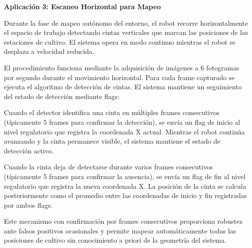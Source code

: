 \textbf{Aplicación 3: Escaneo Horizontal para Mapeo}

Durante la fase de mapeo autónomo del entorno, el robot recorre horizontalmente el espacio de trabajo detectando cintas verticales que marcan las posiciones de las estaciones de cultivo. El sistema opera en modo continuo mientras el robot se desplaza a velocidad reducida.

El procedimiento funciona mediante la adquisición de imágenes a 6 fotogramas por segundo durante el movimiento horizontal. Para cada frame capturado se ejecuta el algoritmo de detección de cintas. El sistema mantiene un seguimiento del estado de detección mediante flags:

Cuando el detector identifica una cinta en múltiples frames consecutivos (típicamente 5 frames para confirmar la detección), se envía un flag de inicio al nivel regulatorio que registra la coordenada X actual. Mientras el robot continúa avanzando y la cinta permanece visible, el sistema mantiene el estado de detección activo.

Cuando la cinta deja de detectarse durante varios frames consecutivos (típicamente 5 frames para confirmar la ausencia), se envía un flag de fin al nivel regulatorio que registra la nueva coordenada X. La posición de la cinta se calcula posteriormente como el promedio entre las coordenadas de inicio y fin registradas por ambos flags.

Este mecanismo con confirmación por frames consecutivos proporciona robustez ante falsos positivos ocasionales y permite mapear automáticamente todas las posiciones de cultivo sin conocimiento a priori de la geometría del sistema.